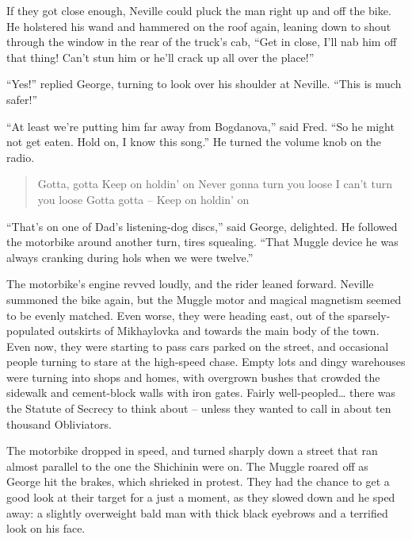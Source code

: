 If they got close enough, Neville could pluck the man right up and off
the bike. He holstered his wand and hammered on the roof again, leaning
down to shout through the window in the rear of the truck's cab, ``Get
in close, I'll nab him off that thing! Can't stun him or he'll crack up
all over the place!''

``Yes!'' replied George, turning to look over his shoulder at Neville.
``This is much safer!''

``At least we're putting him far away from Bogdanova,'' said Fred. ``So
he might not get eaten. Hold on, I know this song.'' He turned the
volume knob on the radio.\\

\begin{quote}
\noindent {} Gotta, gotta\emph{\hfill\break
}Keep on holdin' on\emph{\hfill\break
}Never gonna turn you loose\emph{\hfill\break
}I can't turn you loose\emph{\hfill\break
}Gotta gotta -- Keep on holdin' on \\
\end{quote}

``That's on one of Dad's listening-dog discs,'' said George, delighted.
He followed the motorbike around another turn, tires squealing. ``That
Muggle device he was always cranking during hols when we were twelve.''

The motorbike's engine revved loudly, and the rider leaned forward.
Neville summoned the bike again, but the Muggle motor and magical
magnetism seemed to be evenly matched. Even worse, they were heading
east, out of the sparsely-populated outskirts of Mikhaylovka and towards
the main body of the town. Even now, they were starting to pass cars
parked on the street, and occasional people turning to stare at the
high-speed chase. Empty lots and dingy warehouses were turning into
shops and homes, with overgrown bushes that crowded the sidewalk and
cement-block walls with iron gates. Fairly well-peopled\ldots{} there
was the Statute of Secrecy to think about -- unless they wanted to call
in about ten thousand Obliviators.

The motorbike dropped in speed, and turned sharply down a street that
ran almost parallel to the one the Shichinin were on. The Muggle roared
off as George hit the brakes, which shrieked in protest. They had the
chance to get a good look at their target for a just a moment, as they
slowed down and he sped away: a slightly overweight bald man with thick
black eyebrows and a terrified look on his face.

